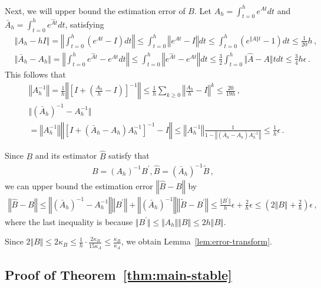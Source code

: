 \documentclass{article}
\theoremstyle{definition}
\begin{document}
Next, we will upper bound the estimation error of $B$. Let $A_{h}=\int_{t=0}^{h}e^{At}dt$ and $\bar{A}_{h}=\int_{t=0}^{h}e^{\hat{A}t}dt$, satisfying
\begin{align*}
&\Vert A_{h}-hI\Vert =\left\Vert\int_{t=0}^{h}(e^{At}-I)dt\right\Vert\leq \int_{t=0}^{h}\left\Vert e^{At}-I\right\Vert dt\leq\int_{t=0}^{h}(e^{\Vert A\Vert t}-1)dt\leq \frac{1}{20}h\,,\\
&\Vert \bar{A}_{h}-A_{h}\Vert =\left\Vert \int_{t=0}^{h}e^{\hat{A}t}-e^{At}dt\right\Vert \leq \int_{t=0}^{h}\left\Vert e^{\hat{A}t}-e^{At}\right\Vert dt\leq \frac{3}{2}\int_{t=0}^{h}\Vert \hat{A}-A\Vert tdt\leq \frac{3}{4}h\epsilon\,.
\end{align*}
This follows that 
\begin{align*}
&\left\Vert A_{h}^{-1}\right\Vert=\frac{1}{h}\left\Vert\left[I+(\frac{A_{h}}{h}-I)\right]^{-1}\right\Vert\leq\frac{1}{h}\sum_{k\geq 0}\left\Vert \frac{A_{h}}{h}-I\right\Vert^{k}\leq \frac{20}{19h}\,,\\
&\Vert (\bar{A}_{h})^{-1}-A_{h}^{-1}\Vert \\
&=\left\Vert A_{h}^{-1}\right\Vert \left\Vert \left[I+(\bar{A}_{h}-A_{h})A_{h}^{-1}\right]^{-1}-I\right\Vert \leq \left\Vert A^{-1}_{h}\right\Vert \frac{1}{1-\left\Vert (\bar{A}_{h}-A_{h})A^{-1}_{h}\right\Vert}\leq  \frac{1}{h}\epsilon\,.
\end{align*}

Since $B$ and its estimator $\hat{B}$ satisfy that
\begin{align*}
B=(A_{h})^{-1}B^{'},\hat{B}=(\bar{A}_{h})^{-1}\widetilde{B}\,,
\end{align*}
we can upper bound the estimation error $\left\Vert \hat{B}-B\right\Vert$ by
\begin{align*}
\left\Vert\hat{B}-B\right\Vert\leq \left\Vert(\bar{A}_{h})^{-1}-A_{h}^{-1}\right\Vert \left\Vert B^{'}\right\Vert+\left\Vert(\bar{A}_{h})^{-1}\right\Vert \left\Vert \widetilde{B}-B^{'}\right\Vert \leq \frac{\Vert B^{'}\Vert }{h}\epsilon+\frac{2}{h}\epsilon\leq(2\Vert B\Vert +\frac{2}{h})\epsilon\,,
\end{align*}
where the last inequality is because $\Vert B^{'}\Vert \leq \Vert A_{h}\Vert \Vert B\Vert \leq 2h\Vert B\Vert $.

Since $2\Vert B\Vert\leq 2\kappa_{B}\leq \frac{1}{h}\cdot \frac{2\kappa_{B}}{15\kappa_{A}}\leq \frac{\kappa_{B}}{\kappa_{A}}$, we obtain Lemma~\ref{lem:error-transform}.

\subsection{Proof of Theorem~\ref{thm:main-stable}}
\label{sec:upper bound}
\end{document}
